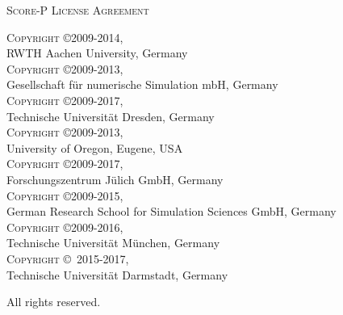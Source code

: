 \begin{center}
  \textsc{\LARGE Score-P License Agreement}
\end{center}

\textsc{Copyright \copyright 2009-2014,} \\
\hspace*{10mm}RWTH Aachen University, Germany \\
\textsc{Copyright \copyright 2009-2013,} \\
\hspace*{10mm}Gesellschaft f{\"u}r numerische Simulation mbH, Germany \\
\textsc{Copyright \copyright 2009-2017,} \\
\hspace*{10mm}Technische Universit{\"a}t Dresden, Germany \\
\textsc{Copyright \copyright 2009-2013,} \\
\hspace*{10mm}University of Oregon, Eugene, USA \\
\textsc{Copyright \copyright 2009-2017,} \\
\hspace*{10mm}Forschungszentrum J{\"u}lich GmbH, Germany \\
\textsc{Copyright \copyright 2009-2015,} \\
\hspace*{10mm}German Research School for Simulation Sciences GmbH, Germany \\
\textsc{Copyright \copyright 2009-2016,} \\
\hspace*{10mm}Technische Universit{\"a}t M{\"u}nchen, Germany \\
\textsc{Copyright \copyright\, 2015-2017,} \\
\hspace*{10mm}Technische Universit{\"a}t Darmstadt, Germany

All rights reserved.
\vfill

